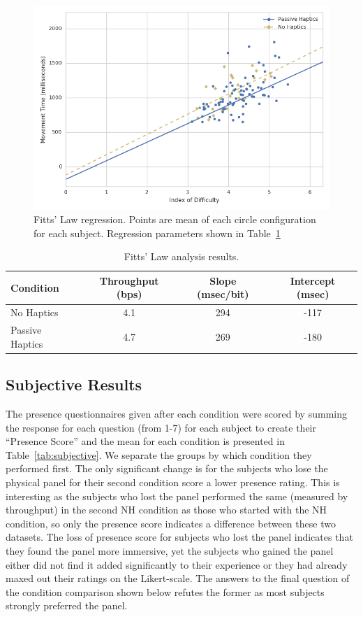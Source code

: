 \documentclass[]{aiaa-tc}%
\begin{document}
\begin{figure}[htb]
  \centering
  \includegraphics{figures/fitts.png}
  \caption{Fitts' Law regression. Points are mean of each circle configuration for each subject. Regression parameters shown in Table~\ref{tab:fitts}}
  \label{fig:fitts}
\end{figure}

\begin{table}
  \centering
  \begin{tabular}{lccc}
    Condition &  Throughput (bps) &  Slope (msec/bit) &  Intercept (msec) \\
    \hline\hline
    No Haptics  &          4.1 &        294 &       -117 \\
    Passive Haptics &          4.7 &        269 &       -180 \\
  \end{tabular}
  \caption{Fitts' Law analysis results.}
  \label{tab:fitts}
\end{table}

\subsection{Subjective Results}

The presence questionnaires given after each condition were scored by summing the response for each question (from 1-7) for each subject to create their ``Presence Score'' and the mean for each condition is presented in Table~\ref{tab:subjective}.
We separate the groups by which condition they performed first.
The only significant change is for the subjects who lose the physical panel for their second condition score a lower presence rating.
This is interesting as the subjects who lost the panel performed the same (measured by throughput) in the second NH condition as those who started with the NH condition, so only the presence score indicates a difference between these two datasets.
The loss of presence score for subjects who lost the panel indicates that they found the panel more immersive, yet the subjects who gained the panel either did not find it added significantly to their experience or they had already maxed out their ratings on the Likert-scale.
The answers to the final question of the condition comparison shown below refutes the former as most subjects strongly preferred the panel.
\end{document}
